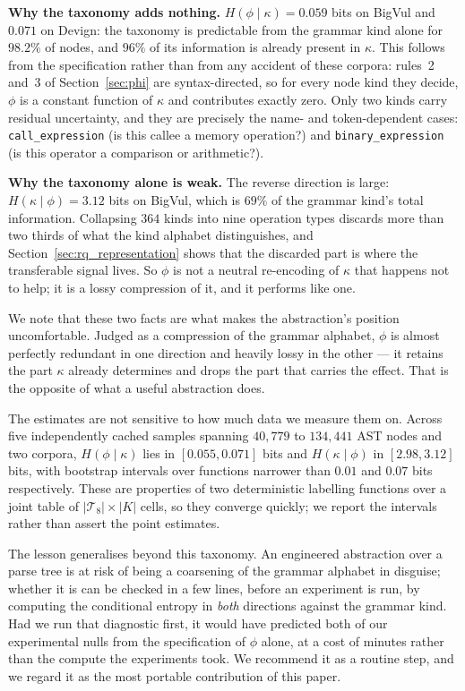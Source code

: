\textbf{Why the taxonomy adds nothing.} $H(\phi \mid \kappa) = 0.059$ bits on
BigVul and $0.071$ on Devign: the taxonomy is predictable from the grammar kind
alone for $98.2\%$ of nodes, and $96\%$ of its information is already present
in $\kappa$. This follows from the specification rather than from any accident
of these corpora: rules~2 and~3 of Section~\ref{sec:phi} are syntax-directed,
so for every node kind they decide, $\phi$ is a constant function of $\kappa$
and contributes exactly zero. Only two kinds carry residual uncertainty, and
they are precisely the name- and token-dependent cases:
\texttt{call\_expression} (is this callee a memory operation?) and
\texttt{binary\_expression} (is this operator a comparison or arithmetic?).

\textbf{Why the taxonomy alone is weak.} The reverse direction is large:
$H(\kappa \mid \phi) = 3.12$ bits on BigVul, which is $69\%$ of the grammar
kind's total information. Collapsing $364$ kinds into nine operation types
discards more than two thirds of what the kind alphabet distinguishes, and
Section~\ref{sec:rq_representation} shows that the discarded part is where the
transferable signal lives. So $\phi$ is not a neutral re-encoding of $\kappa$
that happens not to help; it is a lossy compression of it, and it performs like
one.

We note that these two facts are what makes the abstraction's position
uncomfortable. Judged as a compression of the grammar alphabet, $\phi$ is
almost perfectly redundant in one direction and heavily lossy in the other ---
it retains the part $\kappa$ already determines and drops the part that
carries the effect. That is the opposite of what a useful abstraction does.

The estimates are not sensitive to how much data we measure them on. Across
five independently cached samples spanning $40{,}779$ to $134{,}441$ AST nodes
and two corpora, $H(\phi \mid \kappa)$ lies in $[0.055, 0.071]$ bits and
$H(\kappa \mid \phi)$ in $[2.98, 3.12]$ bits, with bootstrap intervals over
functions narrower than $0.01$ and $0.07$ bits respectively. These are
properties of two deterministic labelling functions over a joint table of
$|\mathcal{T}_8| \times |K|$ cells, so they converge quickly; we report the
intervals rather than assert the point estimates.

The lesson generalises beyond this taxonomy. An engineered abstraction over a
parse tree is at risk of being a coarsening of the grammar alphabet in
disguise; whether it is can be checked in a few lines, before an experiment is
run, by computing the conditional entropy in \emph{both} directions against the
grammar kind. Had we run that diagnostic first, it would have predicted both of
our experimental nulls from the specification of $\phi$ alone, at a cost of
minutes rather than the compute the experiments took. We recommend it as a
routine step, and we regard it as the most portable contribution of this
paper.

